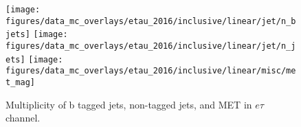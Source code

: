 \begin{figure}[htb!]
    \centering
    \texttt{[image: figures/data\_mc\_overlays/etau\_2016/inclusive/linear/jet/n\_bjets]}
    \texttt{[image: figures/data\_mc\_overlays/etau\_2016/inclusive/linear/jet/n\_jets]}
    \texttt{[image: figures/data\_mc\_overlays/etau\_2016/inclusive/linear/misc/met\_mag]}
    \caption{Multiplicity of b tagged jets, non-tagged jets, and MET in
        $e\tau$ channel.}
    \label{fig:etau_jetmet}
\end{figure}

